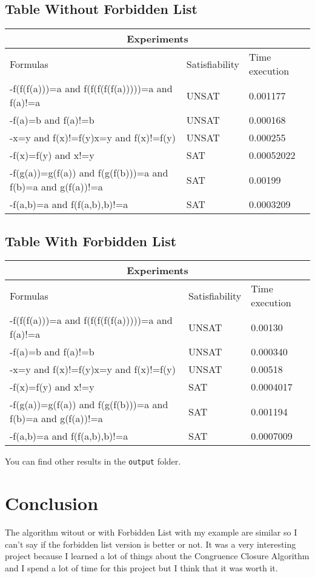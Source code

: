 \documentclass{article}
\begin{document}
\subsection{Table Without Forbidden List}
\begin{tabular}{ |p{10cm}||p{3cm}|p{3cm}|  }
 \hline
 \multicolumn{3}{|c|}{Experiments} \\
 \hline
 Formulas&Satisfiability&Time execution\\
 \hline
 -f(f(f(a)))=a and f(f(f(f(f(a)))))=a and f(a)!=a  &UNSAT&  0.001177\\
 -f(a)=b and f(a)!=b & UNSAT   &0.000168\\
 -x=y and f(x)!=f(y)x=y and f(x)!=f(y)& UNSAT&  0.000255\\
 -f(x)=f(y) and x!=y & SAT&  0.00052022\\
 -f(g(a))=g(f(a)) and f(g(f(b)))=a and f(b)=a and g(f(a))!=a & SAT&0.00199\\
 -f(a,b)=a and f(f(a,b),b)!=a& SAT&0.0003209\\
 \hline
\end{tabular}

\subsection{Table With Forbidden List}
\begin{tabular}{ |p{10cm}||p{3cm}|p{3cm}|  }
    \hline
    \multicolumn{3}{|c|}{Experiments} \\
    \hline
    Formulas&Satisfiability&Time execution\\
    \hline
    -f(f(f(a)))=a and f(f(f(f(f(a)))))=a and f(a)!=a  &UNSAT&  0.00130\\
    -f(a)=b and f(a)!=b & UNSAT   &0.000340\\
    -x=y and f(x)!=f(y)x=y and f(x)!=f(y)& UNSAT&  0.00518\\
    -f(x)=f(y) and x!=y & SAT&  0.0004017\\
    -f(g(a))=g(f(a)) and f(g(f(b)))=a and f(b)=a and g(f(a))!=a & SAT&0.001194\\
    -f(a,b)=a and f(f(a,b),b)!=a& SAT&0.0007009\\
    \hline
   \end{tabular}
You can find other results in the \texttt{output} folder.

\section{Conclusion}
The algorithm witout or with Forbidden List with my example are similar so I can't say if the 
forbidden list version is better or not. 
It was a very interesting project because I learned a lot of things about the Congruence Closure Algorithm and 
I spend a lot of time for this project but I think that it was worth it.
\end{document}
